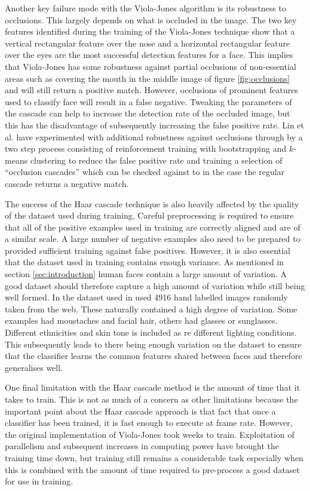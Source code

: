 \documentclass[conference]{IEEEtran}
\begin{document}
Another key failure mode with the Viola-Jones algorithm is its robustness to occlusions. This largely depends on what is occluded in the image. The two key features identified during the training of the Viola-Jones technique show that a vertical rectangular feature over the nose and a horizontal rectangular feature over the eyes are the most successful detection features for a face. This implies that Viola-Jones has some robustness against partial occlusions of non-essential areas such as covering the mouth in the middle image of figure \ref{fig:occlusions} and will still return a positive match. However, occlusions of prominent features used to classify face will result in a false negative. Tweaking the parameters of the cascade can help to increase the detection rate of the occluded image, but this has the disadvantage of subsequently increasing the false positive rate. Lin et al. \cite{lin2004fast} have experimented with additional robustness against occlusions through by a two step process consisting of reinforcement training with bootstrapping and $k$-means clustering to reduce the false positive rate and training a selection of ``occlusion cascades'' which can be checked against to in the case the regular cascade returns a negative match.

The success of the Haar cascade technique is also heavily affected by the quality of the dataset used during training. Careful preprocessing is required to ensure that all of the positive examples used in training are correctly aligned and are of a similar scale. A large number of negative examples also need to be prepared to provided sufficient training against false positives. However, it is also essential that the dataset used in training contains enough variance. As mentioned in section \ref{sec:introduction} human faces contain a large amount of variation. A good dataset should therefore capture a high amount of variation while still being well formed. In the dataset used in \cite{viola2004robust} used 4916 hand labelled images randomly taken from the web. These naturally contained a high degree of variation. Some examples had moustaches and facial hair, others had glasses or sunglasses. Different ethnicities and skin tone is included as re different lighting conditions. This subsequently leads to there being enough variation on the dataset to ensure that the classifier learns the common features shared between faces and therefore generalises well.

One final limitation with the Haar cascade method is the amount of time that it takes to train. This is not as much of a concern as other limitations because the important point about the Haar cascade approach is that fact that once a classifier has been trained, it is fast enough to execute at frame rate. However, the original implementation of Viola-Jones took weeks to train. Exploitation of parallelism \cite{viola2004robust} and subsequent increases in computing power have brought the training time down, but training still remains a considerable task especially when this is combined with the amount of time required to pre-process a good dataset for use in training.
\end{document}
